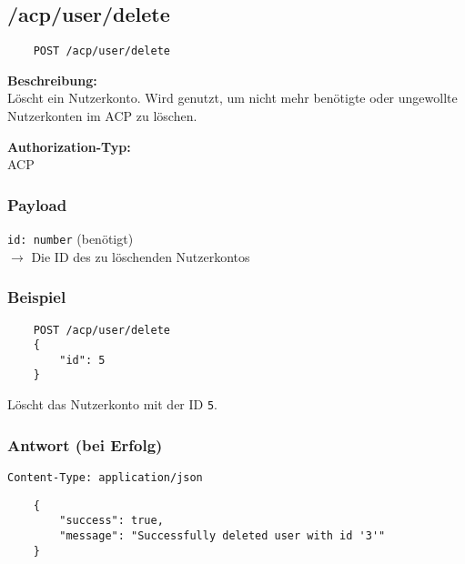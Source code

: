 \subsection{/acp/user/delete}

\begin{lstlisting}
    POST /acp/user/delete
\end{lstlisting}

\textbf{Beschreibung:} \\
Löscht ein Nutzerkonto. Wird genutzt, um nicht mehr benötigte oder ungewollte Nutzerkonten im ACP zu löschen.

\textbf{Authorization-Typ:} \\
ACP

\subsubsection{Payload}

\lstinline{id: number} (benötigt) \\
$\rightarrow$ Die ID des zu löschenden Nutzerkontos

\subsubsection{Beispiel}

\begin{lstlisting}
    POST /acp/user/delete
    {
        "id": 5
    }
\end{lstlisting}

Löscht das Nutzerkonto mit der ID \lstinline{5}.

\subsubsection{Antwort (bei Erfolg)}

\lstinline{Content-Type: application/json}
\begin{lstlisting}
    {
        "success": true, 
        "message": "Successfully deleted user with id '3'"
    }
\end{lstlisting}